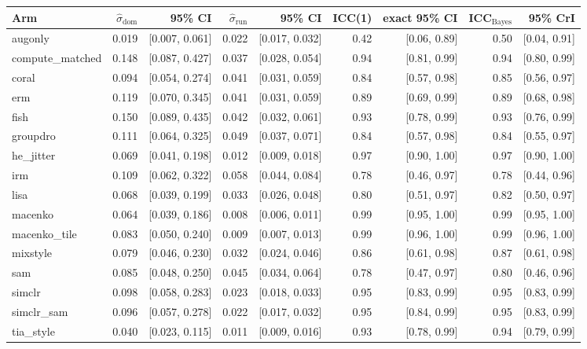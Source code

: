 \begin{tabular}{lrrrrrrrr}
\toprule
Arm & $\hat\sigma_\text{dom}$ & 95\% CI & $\hat\sigma_\text{run}$ & 95\% CI & ICC(1) & exact 95\% CI & ICC$_\text{Bayes}$ & 95\% CrI \\
\midrule
augonly & 0.019 & [0.007, 0.061] & 0.022 & [0.017, 0.032] & 0.42 & [0.06, 0.89] & 0.50 & [0.04, 0.91] \\
compute\_matched & 0.148 & [0.087, 0.427] & 0.037 & [0.028, 0.054] & 0.94 & [0.81, 0.99] & 0.94 & [0.80, 0.99] \\
coral & 0.094 & [0.054, 0.274] & 0.041 & [0.031, 0.059] & 0.84 & [0.57, 0.98] & 0.85 & [0.56, 0.97] \\
erm & 0.119 & [0.070, 0.345] & 0.041 & [0.031, 0.059] & 0.89 & [0.69, 0.99] & 0.89 & [0.68, 0.98] \\
fish & 0.150 & [0.089, 0.435] & 0.042 & [0.032, 0.061] & 0.93 & [0.78, 0.99] & 0.93 & [0.76, 0.99] \\
groupdro & 0.111 & [0.064, 0.325] & 0.049 & [0.037, 0.071] & 0.84 & [0.57, 0.98] & 0.84 & [0.55, 0.97] \\
he\_jitter & 0.069 & [0.041, 0.198] & 0.012 & [0.009, 0.018] & 0.97 & [0.90, 1.00] & 0.97 & [0.90, 1.00] \\
irm & 0.109 & [0.062, 0.322] & 0.058 & [0.044, 0.084] & 0.78 & [0.46, 0.97] & 0.78 & [0.44, 0.96] \\
lisa & 0.068 & [0.039, 0.199] & 0.033 & [0.026, 0.048] & 0.80 & [0.51, 0.97] & 0.82 & [0.50, 0.97] \\
macenko & 0.064 & [0.039, 0.186] & 0.008 & [0.006, 0.011] & 0.99 & [0.95, 1.00] & 0.99 & [0.95, 1.00] \\
macenko\_tile & 0.083 & [0.050, 0.240] & 0.009 & [0.007, 0.013] & 0.99 & [0.96, 1.00] & 0.99 & [0.96, 1.00] \\
mixstyle & 0.079 & [0.046, 0.230] & 0.032 & [0.024, 0.046] & 0.86 & [0.61, 0.98] & 0.87 & [0.61, 0.98] \\
sam & 0.085 & [0.048, 0.250] & 0.045 & [0.034, 0.064] & 0.78 & [0.47, 0.97] & 0.80 & [0.46, 0.96] \\
simclr & 0.098 & [0.058, 0.283] & 0.023 & [0.018, 0.033] & 0.95 & [0.83, 0.99] & 0.95 & [0.83, 0.99] \\
simclr\_sam & 0.096 & [0.057, 0.278] & 0.022 & [0.017, 0.032] & 0.95 & [0.84, 0.99] & 0.95 & [0.83, 0.99] \\
tia\_style & 0.040 & [0.023, 0.115] & 0.011 & [0.009, 0.016] & 0.93 & [0.78, 0.99] & 0.94 & [0.79, 0.99] \\
\bottomrule
\end{tabular}
